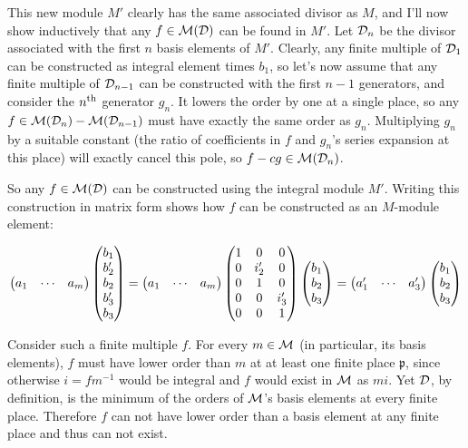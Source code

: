 This new module $M'$ clearly has the same associated divisor as $M$,
and I'll now show inductively that any $f \in {\cal M}({\cal D})$ can
be found in $M'$.  Let ${\cal D}_n$ be the divisor associated with the
first $n$ basis elements of $M'$.  Clearly, any finite multiple of
${\cal D}_1$ can be constructed as integral element times $b_1$, so
let's now assume that any finite multiple of ${\cal D}_{n-1}$ can be
constructed with the first $n-1$ generators, and consider the $n^{\rm
th}$ generator $g_n$.  It lowers the order by one at a single place,
so any $f \in {\cal M}({\cal D}_n) - {\cal M}({\cal D}_{n-1})$ must
have exactly the same order as $g_n$.  Multiplying $g_n$ by a suitable
constant (the ratio of coefficients in $f$ and $g_n$'s series
expansion at this place) will exactly cancel this pole, so $f - cg \in
{\cal M}({\cal D}_n)$.

So any $f \in {\cal M}({\cal D})$ can be constructed using the
integral module $M'$.  Writing this construction in matrix form
shows how $f$ can be constructed as an $M$-module element:

$$\begin{pmatrix}a_1 & \cdots & a_m\end{pmatrix} \begin{pmatrix}b_1 \cr b_2' \cr b_2 \cr b_3' \cr b_3\end{pmatrix}
= \begin{pmatrix}a_1 & \cdots & a_m\end{pmatrix}\begin{pmatrix}1 & 0 & 0 \cr 0 & i_2' & 0 \cr 0 & 1 & 0 \cr 0 & 0 & i_3' \cr 0 & 0 &1\end{pmatrix}\begin{pmatrix}b_1 \cr b_2 \cr b_3\end{pmatrix}
= \begin{pmatrix}a_1' & \cdots & a_3'\end{pmatrix}\begin{pmatrix}b_1 \cr b_2 \cr b_3\end{pmatrix}
$$


  Consider such a finite multiple $f$.  For every
$m \in {\cal M}$ (in particular, its basis elements), $f$ must have
lower order than $m$ at at least one finite place $\mathfrak{p}$,
since otherwise $i = fm^{-1}$ would be integral and $f$ would exist in
${\cal M}$ as $mi$.  Yet ${\cal D}$, by definition, is the minimum of
the orders of ${\cal M}$'s basis elements at every finite place.
Therefore $f$ can not have lower order than a basis element at any
finite place and thus can not exist.

